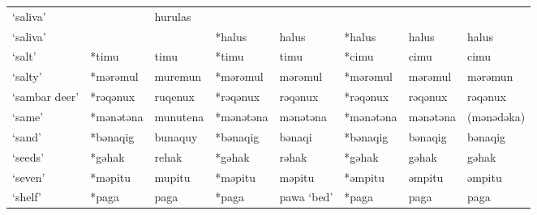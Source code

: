 \begin{landscape}
\begin{longtable}[c]{@{}p{3cm}<{\raggedright}p{2.75cm}<{\raggedright}p{2.75cm}<{\raggedright}p{2.75cm}<{\raggedright}p{2.75cm}<{\raggedright}p{2.75cm}<{\raggedright}p{2.75cm}<{\raggedright}p{2.75cm}<{\raggedright}@{}}
`saliva'                                             &                    & hurulas                        &                    &                            &                  &                          &                                   \\
`saliva'                                             &                    &                                & *halus             & halus                      & *halus           & halus                    & halus                             \\
`salt'                                               & *timu              & timu                           & *timu              & timu                       & *cimu            & cimu                     & cimu                              \\
`salty'                                              & *mərəmul           & muremun                        & *mərəmul           & mərəmul                    & *mərəmul         & mərəmul                  & mərəmun                           \\
`sambar deer'                                        & *rəqənux           & ruqenux                        & *rəqənux           & rəqənux                    & *rəqənux         & rəqənux                  & rəqənux                           \\
`same'                                               & *mənətəna          & munutena                       & *mənətəna          & mənətəna                   & *mənətəna        & mənətəna                 & (mənədəka)                        \\
`sand'                                               & *bənaqig           & bunaquy                        & *bənaqig           & bənaqi                     & *bənaqig         & bənaqig                  & bənaqig                           \\
`seeds'                                              & *gəhak             & rehak                          & *gəhak             & rəhak                      & *gəhak           & gəhak                    & gəhak                             \\
`seven'                                              & *məpitu            & mupitu                         & *məpitu            & məpitu                     & *əmpitu          & əmpitu                   & əmpitu                            \\
`shelf'                                              & *paga              & paga                           & *paga              & pawa `bed'                 & *paga            & paga                     & paga                              \\

\end{longtable}
\end{landscape}
